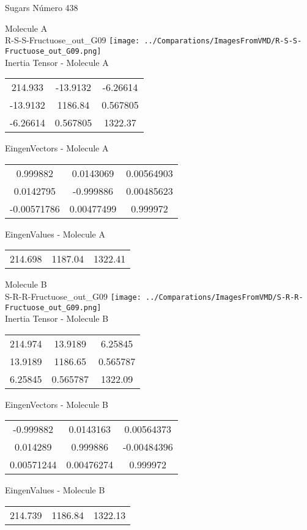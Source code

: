 \vtab[-2cm]
\begin{center}
{\large Sugars \tab Número 438}
\end{center}
\begin{multicols}{2}
\begin{center}

Molecule A \\ 
R-S-S-Fructuose\_out\_G09
\texttt{[image: ../Comparations/ImagesFromVMD/R-S-S-Fructuose\_out\_G09.png]}
\\
Inertia Tensor - Molecule A \\
\vtab

\begin{tabular}{|c c c|}
214.933	 & 	-13.9132	 & 	-6.26614	 \\
-13.9132	 & 	1186.84	 & 	0.567805	 \\
-6.26614	 & 	0.567805	 & 	1322.37
\end{tabular}

\vtab
 EingenVectors - Molecule A     \\
\vtab
\begin{tabular}{|c c c|}
0.999882	 & 	0.0143069	 & 	0.00564903	 \\
0.0142795	 & 	-0.999886	 & 	0.00485623	 \\
-0.00571786	 & 	0.00477499	 & 	0.999972
\end{tabular}

\vtab
 EingenValues - Molecule A     \\
\vtab
\begin{tabular}{|c c c|}
214.698	 & 	1187.04	 & 	1322.41	 \\
\end{tabular}
\columnbreak

Molecule B \\ 
S-R-R-Fructuose\_out\_G09
\texttt{[image: ../Comparations/ImagesFromVMD/S-R-R-Fructuose\_out\_G09.png]}
\\
Inertia Tensor - Molecule B \\
\vtab

\begin{tabular}{|c c c|}
214.974	 & 	13.9189	 & 	6.25845	 \\
13.9189	 & 	1186.65	 & 	0.565787	 \\
6.25845	 & 	0.565787	 & 	1322.09
\end{tabular}

\vtab
 EingenVectors - Molecule B     \\
\vtab
\begin{tabular}{|c c c|}
-0.999882	 & 	0.0143163	 & 	0.00564373	 \\
0.014289	 & 	0.999886	 & 	-0.00484396	 \\
0.00571244	 & 	0.00476274	 & 	0.999972
\end{tabular}

\vtab
 EingenValues - Molecule B     \\
\vtab
\begin{tabular}{|c c c|}
214.739	 & 	1186.84	 & 	1322.13	 \\
\end{tabular}

\end{center}
\end{multicols}
